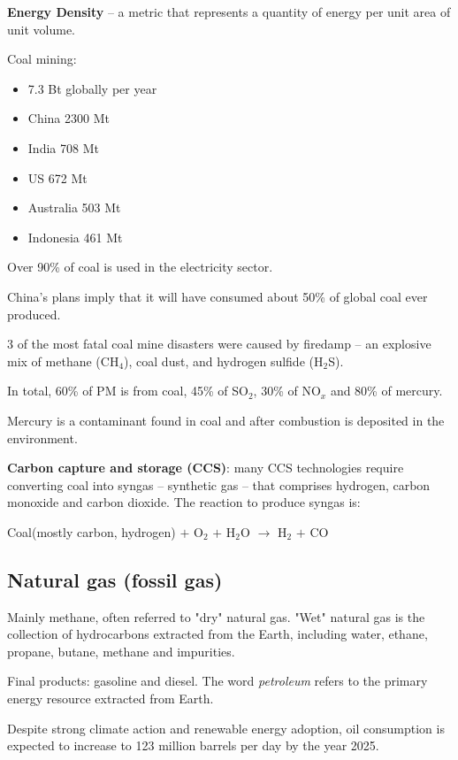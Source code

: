 \textbf{Energy Density} -- a metric that represents a quantity of energy per
unit area of unit volume.

Coal mining: 
\begin{itemize}
	\item 7.3 Bt globally per year
	\item China 2300 Mt
	\item India 708 Mt
	\item US 672 Mt
	\item Australia 503 Mt
	\item Indonesia 461 Mt
\end{itemize}

Over 90\% of coal is used in the electricity sector.

China's plans imply that it will have consumed about 50\% of global coal ever
produced.

3 of the most fatal coal mine disasters were caused by firedamp -- an explosive
mix of methane (CH$_4$), coal dust, and hydrogen sulfide (H$_2$S).

In total, 60\% of PM is from coal, 45\% of SO$_2$, 30\% of NO$_x$ and 80\%
of mercury.

Mercury is a contaminant found in coal and after combustion is deposited in the
environment.

\textbf{Carbon capture and storage (CCS)}: many CCS technologies require
converting coal into syngas -- synthetic gas -- that comprises hydrogen,
carbon monoxide and carbon dioxide. The reaction to produce syngas is:

Coal(mostly carbon, hydrogen) $+$ O$_2$ $+$ H$_2$O $\rightarrow$ H$_2$ $+$ CO

\subsection{Natural gas (fossil gas)}

Mainly methane, often referred to "dry" natural gas. "Wet" natural gas is the
collection of hydrocarbons extracted from the Earth, including water, ethane,
propane, butane, methane and impurities.


Final products: gasoline and diesel. The word \textit{petroleum} refers to the
primary energy resource extracted from Earth.

Despite strong climate action and renewable energy adoption, oil consumption is
expected to increase to 123 million barrels per day by the year 2025.

